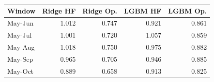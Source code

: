 \begin{tabular}{lrrrr}
\toprule
Window & Ridge HF & Ridge Op. & LGBM HF & LGBM Op. \\
\midrule
May-Jun & 1.012 & 0.747 & 0.921 & 0.861 \\
May-Jul & 1.001 & 0.720 & 1.057 & 0.859 \\
May-Aug & 1.018 & 0.750 & 0.975 & 0.882 \\
May-Sep & 0.965 & 0.705 & 0.946 & 0.885 \\
May-Oct & 0.889 & 0.658 & 0.913 & 0.825 \\
\bottomrule
\end{tabular}

